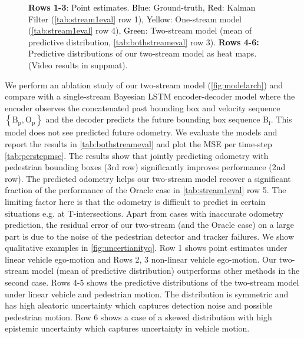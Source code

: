 \begin{figure*}[!t]
{\begin{tabular}{cccc}
    

\bottomrule
\end{tabular}
}
\caption{\textbf{Rows 1-3}: Point estimates. \textcolor{black}{Blue}: Ground-truth, \textcolor{black}{Red}: Kalman Filter (\autoref{tab:stream1eval} row 1), \textcolor{black}{Yellow}: One-stream model (\autoref{tab:stream1eval} row 4), \textcolor{black}{Green}: Two-stream model (mean of predictive distribution, \autoref{tab:bothstreameval} row 3). \textbf{Rows 4-6:} Predictive distributions of our two-stream model as heat maps. (Video results in suppmat). }\label{fig:uncertianityq}
\end{figure*}
%

  We perform an ablation study of our two-stream model (\autoref{fig:modelarch}) and compare with a single-stream Bayesian LSTM encoder-decoder model where the encoder observes the concatenated past bounding box and velocity sequence $\left\{ \text{B}_{\text{p}}, \text{O}_{\text{p}}\right\}$ and the decoder predicts the future bounding box sequence $\text{B}_{\text{f}}$. This model does not see predicted future odometry. We evaluate the models and report the results in \autoref{tab:bothstreameval} and plot the MSE per time-step \autoref{tab:perstepmse}. The results show that jointly predicting odometry with pedestrian bounding boxes (3rd row) significantly improves performance (2nd row). The predicted odometry helps our two-stream model recover a significant fraction of the performance of the Oracle case in \autoref{tab:stream1eval} row 5. The limiting factor here is that the odometry is difficult to predict in certain situations e.g. at T-intersections. Apart from cases with inaccurate odometry prediction, the residual error of our two-stream (and the Oracle case) on a large part is due to the noise of the pedestrian detector and tracker failures. We show qualitative examples in \autoref{fig:uncertianityq}. Row 1 shows point estimates under linear vehicle ego-motion and Rows 2, 3 non-linear vehicle ego-motion. Our two-stream model (mean of predictive distribution) outperforms other methods in the second case. Rows 4-5 shows the predictive distributions of the two-stream model under linear vehicle and pedestrian motion. The distribution is symmetric and has high aleatoric uncertainty which captures detection noise and possible pedestrian motion. Row 6 shows a case of a skewed distribution with high epistemic uncertainty which captures uncertainty in vehicle motion.

